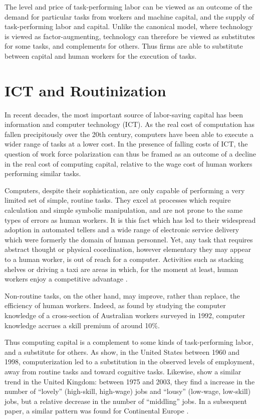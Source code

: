 \documentclass[a4paper,11pt]{article}
\begin{document}
The level and price of task-performing labor can be 
viewed as an outcome of the demand for particular tasks from workers and machine capital, and the supply of task-performing labor and capital. Unlike the canonical model, where technology is viewed as factor-augmenting,  technology can therefore be viewed as substitutes for some tasks, and complements for others. Thus firms are able to substitute between capital and human workers for the execution of tasks.

\section{ICT and Routinization}

In recent decades, the most important source of labor-saving capital has been information and computer technology (ICT). As the real cost of computation has fallen precipitously over the 20th century, computers have been able to execute a wider range of tasks at a lower cost. In the presence of falling costs of ICT, the question of work force polarization can thus be framed as an outcome of a decline in the real cost of computing capital, relative to the wage cost of human workers performing similar tasks.

Computers, despite their sophistication, are only capable of performing a very limited set of simple, routine tasks. They excel at processes which require calculation and simple symbolic manipulation, and are not prone to the same types of errors as human workers. It is this fact which has led to their widespread adoption in automated tellers and a wide range of electronic service delivery which were formerly the domain of human personnel. Yet, any task that requires abstract thought or physical coordination, however elementary they may appear to a human worker, is out of reach for a computer. Activities such as stacking shelves or driving a taxi are areas in which, for the moment at least, human workers enjoy a competitive advantage \citet{Levy2003}. 

Non-routine tasks, on the other hand, may improve, rather than replace, the efficiency of human workers. Indeed, as \citet{Borland2004} found by studying the computer knowledge of a cross-section of Australian workers surveyed in 1992, computer knowledge accrues a skill premium of around 10\%.

Thus computing capital is a complement to some kinds of task-performing labor, and a substitute for others. As \citet{Levy2003} show, in the United States between 1960 and 1998, computerization led to a substitution in the observed levels of employment, away from routine tasks and toward cognitive tasks. Likewise, \citet{Goos2007} show a similar trend in the United Kingdom: between 1975 and 2003, they find a increase in the number of ``lovely'' (high-skill, high-wage) jobs and ``lousy'' (low-wage, low-skill) jobs, but a relative decrease in the number of ``middling'' jobs. In a subsequent paper, a similar pattern was found for Continental Europe \citep{Goos2009}.
\end{document}
